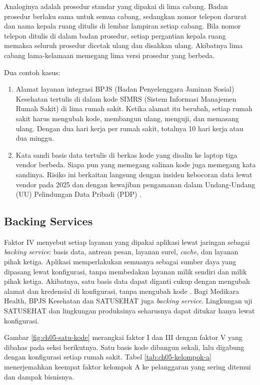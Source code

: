 Analoginya adalah prosedur standar yang dipakai di lima cabang. Badan prosedur berlaku sama
untuk semua cabang, sedangkan nomor telepon darurat dan nama kepala ruang ditulis di lembar
lampiran setiap cabang. Bila nomor telepon ditulis di dalam badan prosedur, setiap
pergantian kepala ruang memaksa seluruh prosedur dicetak ulang dan disahkan ulang.
Akibatnya lima cabang lama-kelamaan memegang lima versi prosedur yang berbeda.

Dua contoh kasus:
\begin{enumerate}
  \item Alamat layanan integrasi BPJS (Badan Penyelenggara Jaminan Sosial) Kesehatan
        tertulis di dalam kode SIMRS (Sistem Informasi Manajemen Rumah Sakit) di lima
        rumah sakit. Ketika alamat itu berubah, setiap rumah sakit harus mengubah kode,
        membangun ulang, menguji, dan memasang ulang. Dengan dua hari kerja per rumah
        sakit, totalnya 10 hari kerja atau dua minggu.
  \item Kata sandi basis data tertulis di berkas kode yang disalin ke laptop tiga vendor
        berbeda. Siapa pun yang memegang salinan kode juga memegang kata sandinya. Risiko
        ini berkaitan langsung dengan insiden kebocoran data lewat vendor pada 2025 dan
        dengan kewajiban pengamanan dalam Undang-Undang (UU) Pelindungan Data Pribadi (PDP)
        \cite{uu27-2022-pdp}.
\end{enumerate}

\subsection{Backing Services}

Faktor IV menyebut setiap layanan yang dipakai aplikasi lewat jaringan sebagai
\textit{backing service}: basis data, antrean pesan, layanan surel, \textit{cache}, dan
layanan pihak ketiga. Aplikasi memperlakukan semuanya sebagai sumber daya yang dipasang
lewat konfigurasi, tanpa membedakan layanan milik sendiri dan milik pihak ketiga.
Akibatnya, satu basis data dapat diganti cukup dengan mengubah alamat dan kredensial di
konfigurasi, tanpa mengubah kode \cite{twelvefactor}. Bagi Medikara Health, BPJS Kesehatan
dan SATUSEHAT juga \textit{backing service}. Lingkungan uji SATUSEHAT dan lingkungan
produksinya seharusnya dapat ditukar hanya lewat konfigurasi.

Gambar \ref{fig:ch05-satu-kode} merangkai faktor I dan III dengan faktor V yang dibahas
pada seksi berikutnya. Satu basis kode dibangun sekali, lalu digabung dengan konfigurasi
setiap rumah sakit. Tabel \ref{tab:ch05-kelompok-a} menerjemahkan keempat faktor kelompok A
ke pelanggaran yang sering ditemui dan dampak bisnisnya.


